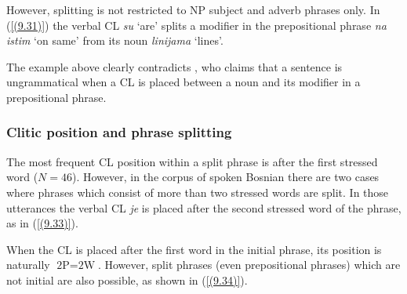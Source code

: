 \noindent However, splitting is not restricted to NP subject and adverb phrases only. In (\ref{(9.31)}) the verbal CL \textit{su} ‘are’ splits a modifier in the prepositional phrase \textit{na istim} ‘on same’ from its noun \textit{linijama} ‘lines’.


\noindent The example above clearly contradicts \citet[436]{RadanovicKocic96}, who claims that a sentence is ungrammatical when a CL is placed between a noun and its modifier in a prepositional phrase. 

\subsubsection{Clitic position and phrase splitting}

The most frequent CL position within a split phrase is after the first stressed word ($N=46$). However, in the corpus of spoken Bosnian there are two cases where phrases which consist of more than two stressed words are split. In those utterances the verbal CL \textit{je} is placed after the second stressed word of the phrase, as in (\ref{(9.33)}).


\noindent When the CL is placed after the first word in the initial phrase, its position is naturally  $\text{2P}=\text{2W}$. However, split phrases (even prepositional phrases) which are not initial are also possible, as shown in (\ref{(9.34)}).


